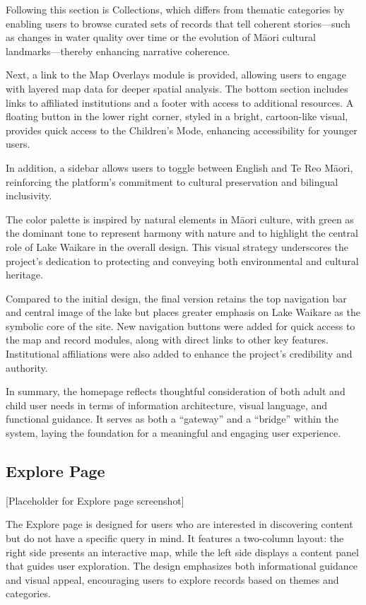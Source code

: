 Following this section is Collections, which differs from thematic categories by enabling users to browse curated sets of records that tell coherent stories—such as changes in water quality over time or the evolution of Māori cultural landmarks—thereby enhancing narrative coherence.

Next, a link to the Map Overlays module is provided, allowing users to engage with layered map data for deeper spatial analysis. The bottom section includes links to affiliated institutions and a footer with access to additional resources. A floating button in the lower right corner, styled in a bright, cartoon-like visual, provides quick access to the Children’s Mode, enhancing accessibility for younger users.

In addition, a sidebar allows users to toggle between English and Te Reo Māori, reinforcing the platform’s commitment to cultural preservation and bilingual inclusivity.

The color palette is inspired by natural elements in Māori culture, with green as the dominant tone to represent harmony with nature and to highlight the central role of Lake Waikare in the overall design. This visual strategy underscores the project’s dedication to protecting and conveying both environmental and cultural heritage.

Compared to the initial design, the final version retains the top navigation bar and central image of the lake but places greater emphasis on Lake Waikare as the symbolic core of the site. New navigation buttons were added for quick access to the map and record modules, along with direct links to other key features. Institutional affiliations were also added to enhance the project's credibility and authority.

In summary, the homepage reflects thoughtful consideration of both adult and child user needs in terms of information architecture, visual language, and functional guidance. It serves as both a “gateway” and a “bridge” within the system, laying the foundation for a meaningful and engaging user experience.

\subsection{Explore Page}
[Placeholder for Explore page screenshot]

The Explore page is designed for users who are interested in discovering content but do not have a specific query in mind. It features a two-column layout: the right side presents an interactive map, while the left side displays a content panel that guides user exploration. The design emphasizes both informational guidance and visual appeal, encouraging users to explore records based on themes and categories.

